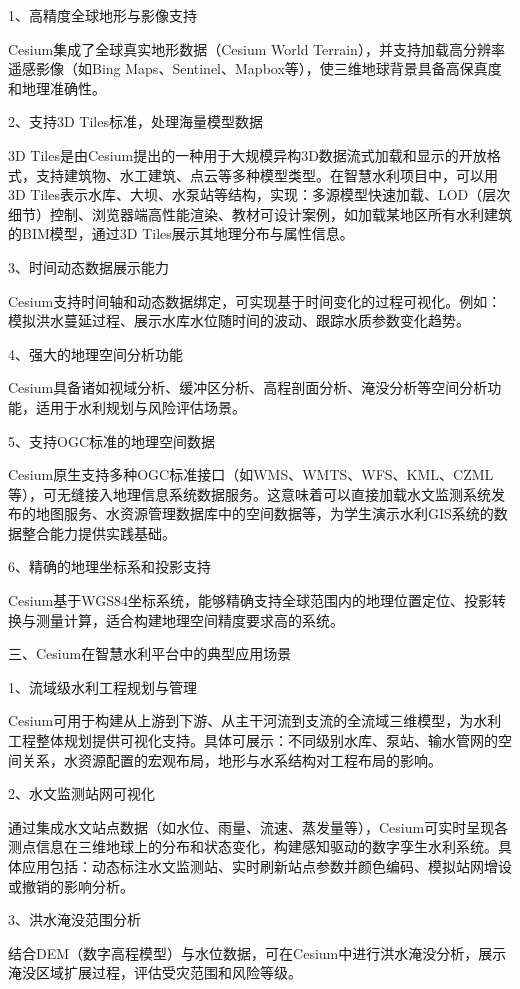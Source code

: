 1、高精度全球地形与影像支持

Cesium集成了全球真实地形数据（Cesium World Terrain），并支持加载高分辨率遥感影像（如Bing Maps、Sentinel、Mapbox等），使三维地球背景具备高保真度和地理准确性。

2、支持3D Tiles标准，处理海量模型数据

3D Tiles是由Cesium提出的一种用于大规模异构3D数据流式加载和显示的开放格式，支持建筑物、水工建筑、点云等多种模型类型。在智慧水利项目中，可以用3D Tiles表示水库、大坝、水泵站等结构，实现：多源模型快速加载、LOD（层次细节）控制、浏览器端高性能渲染、教材可设计案例，如加载某地区所有水利建筑的BIM模型，通过3D Tiles展示其地理分布与属性信息。

3、时间动态数据展示能力

Cesium支持时间轴和动态数据绑定，可实现基于时间变化的过程可视化。例如：模拟洪水蔓延过程、展示水库水位随时间的波动、跟踪水质参数变化趋势。

4、强大的地理空间分析功能

Cesium具备诸如视域分析、缓冲区分析、高程剖面分析、淹没分析等空间分析功能，适用于水利规划与风险评估场景。

5、支持OGC标准的地理空间数据

Cesium原生支持多种OGC标准接口（如WMS、WMTS、WFS、KML、CZML等），可无缝接入地理信息系统数据服务。这意味着可以直接加载水文监测系统发布的地图服务、水资源管理数据库中的空间数据等，为学生演示水利GIS系统的数据整合能力提供实践基础。

6、精确的地理坐标系和投影支持

Cesium基于WGS84坐标系统，能够精确支持全球范围内的地理位置定位、投影转换与测量计算，适合构建地理空间精度要求高的系统。

三、Cesium在智慧水利平台中的典型应用场景

1、流域级水利工程规划与管理

Cesium可用于构建从上游到下游、从主干河流到支流的全流域三维模型，为水利工程整体规划提供可视化支持。具体可展示：不同级别水库、泵站、输水管网的空间关系，水资源配置的宏观布局，地形与水系结构对工程布局的影响。

2、水文监测站网可视化

通过集成水文站点数据（如水位、雨量、流速、蒸发量等），Cesium可实时呈现各测点信息在三维地球上的分布和状态变化，构建感知驱动的数字孪生水利系统。具体应用包括：动态标注水文监测站、实时刷新站点参数并颜色编码、模拟站网增设或撤销的影响分析。

3、洪水淹没范围分析

结合DEM（数字高程模型）与水位数据，可在Cesium中进行洪水淹没分析，展示淹没区域扩展过程，评估受灾范围和风险等级。

